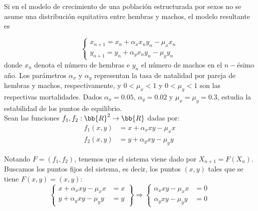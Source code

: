 \begin{ejercicio}
    Si en el modelo de crecimiento de una población estructurada por sexos no se asume una distribución equitativa entre hembras y machos, el modelo resultante es

    \begin{equation*}
        \begin{cases}
        x_{n+1} = x_n + \alpha_x x_n y_n - \mu_x x_n\\
        y_{n+1} = y_n + \alpha_y x_n y_n - \mu_y y_n
        \end{cases}
    \end{equation*}
    donde $x_n$ denota el número de hembras e $y_n$ el número de machos en el $n-$ésimo año. Los parámetros $\alpha_x$ y $\alpha_y$ representan la tasa de natalidad por pareja de hembras y machos, respectivamente, y $0 < \mu_x < 1$ y $0 < \mu_y < 1$ son las respectivas mortalidades.
    Dados $\alpha_x = 0.05$, $\alpha_y = 0.02$ y $\mu_x = \mu_y = 0.3$, estudia la estabilidad de los puntos de equilibrio.\\

    Sean las funciones $f_1, f_2:\bb{R}^2\to\bb{R}$ dadas por:
    \begin{align*}
        f_1(x,y) &= x + \alpha_x xy - \mu_x x\\
        f_2(x,y) &= y + \alpha_y xy - \mu_y y
    \end{align*}

    Notando $F=(f_1,f_2)$, tenemos que el sistema viene dado por $X_{n+1} = F(X_n)$.
    Buscamos los puntos fijos del sistema, es decir, los puntos $(x,y)$ tales que se tiene $F(x,y) = (x,y)$:
    \begin{equation*}
        \left\{
            \begin{array}{lr}
                x + \alpha_x xy - \mu_x x &= x\\
                y + \alpha_y xy - \mu_y y &= y
            \end{array}
        \right\}
        \Longrightarrow
        \left\{
            \begin{array}{lr}
                \alpha_x xy - \mu_x x &=0\\
                \alpha_y xy - \mu_y y &=0
            \end{array}
        \right.
    \end{equation*}


\end{ejercicio}
